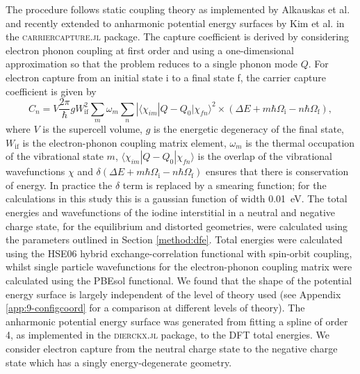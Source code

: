 The procedure follows static coupling theory as implemented by Alkauskas et al.\autocite{Alkauskas2014} and recently extended to anharmonic potential energy surfaces by Kim et al. in the \textsc{carriercapture.jl} package.\autocite{carriercapture,Kim2019}
The capture coefficient is derived by considering electron phonon coupling at first order and using a one-dimensional approximation so that the problem reduces to a single phonon mode $Q$. For electron capture from an initial state i to a final state f, the carrier capture coefficient is given by
\begin{equation} \label{carriercapteqn}
    C_n = V\frac{2\pi}{\hbar}gW_\textrm{if}^2\sum_m\omega_m\sum_n|\langle\chi_{im}|Q-Q_0|\chi_{fn}\rangle^2\times (\Delta E+m\hbar\Omega_\textrm{i}-n\hbar\Omega_\textrm{f}),
\end{equation}
where $V$ is the supercell volume, $g$ is the energetic degeneracy of the final state, $W_\textrm{if}$ is the electron-phonon coupling matrix element, $\omega_m$ is the thermal occupation of the vibrational state $m$, $\langle\chi_{im}|Q-Q_0|\chi_{fn}\rangle$ is the overlap of the vibrational wavefunctions $\chi$ and $\delta(\Delta E+m\hbar\Omega_\textrm{i}-n\hbar\Omega_\textrm{f})$ ensures that there is conservation of energy. In practice the $\delta$ term is replaced by a smearing function; for the calculations in this study this is a gaussian function of width \SI{0.01}{\electronvolt}.
The total energies and wavefunctions of the iodine interstitial in a neutral and negative charge state, for the equilibrium and distorted geometries, were calculated using the parameters outlined in Section \ref{method:dfe}. Total energies were calculated using the HSE06 hybrid exchange-correlation functional with spin-orbit coupling, whilst single particle wavefunctions for the electron-phonon coupling matrix were calculated using the PBEsol functional.
We found that the shape of the potential energy surface is largely independent of the level of theory used (see Appendix \ref{app:9-configcoord} for a comparison at different levels of theory).
The anharmonic potential energy surface was generated from fitting a spline of order 4, as implemented in the \textsc{dierckx.jl} package,\autocite{dierckx} to the DFT total energies. 
We consider electron capture from the neutral charge state to the negative charge state which has a singly energy-degenerate geometry.

